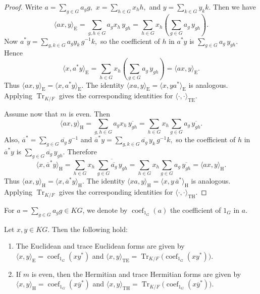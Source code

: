 \documentclass[11pt]{article}
\begin{document}
\begin{proof}
Write
$
a=\sum_{g\in G} a_g g,$ $
x=\sum_{h\in G} x_h h,$ and
$y=\sum_{k\in G} y_k k.$
Then we have
$$
\langle ax,y\rangle_{\mathrm{E}}
=
\sum_{g,h\in G} a_gx_h\,y_{gh}
=
\sum_{h\in G} x_h (\sum_{g\in G} a_g\,y_{gh}).
$$
Now $a^\ast y=\sum_{g,k\in G} a_g y_k\,g^{-1}k,
$
so the coefficient of $h$ in $a^\ast y$ is $\sum_{g\in G} a_g\,y_{gh}$. Hence
$$
\langle x,a^\ast y\rangle_{\mathrm{E}}
=
\sum_{h\in G} x_h (\sum_{g\in G} a_g\,y_{gh})
=
\langle ax,y\rangle_{\mathrm{E}}.
$$
Thus $\langle ax,y\rangle_{\mathrm{E}}=\langle x,a^\ast y\rangle_{\mathrm{E}}$. The identity
$
\langle xa,y\rangle_{\mathrm{E}}=\langle x,ya^\ast\rangle_{\mathrm{E}}
$
is analogous. Applying $\operatorname{Tr}_{K/F}$ gives the corresponding identities for $\langle\cdot,\cdot\rangle_{\mathrm{TE}}$.

Assume now that $m$ is even. Then
$$
\langle ax,y\rangle_{\mathrm{H}}
=
\sum_{g,h\in G} a_gx_h\,\overline{y_{gh}}
=
\sum_{h\in G} x_h \sum_{g\in G} a_g\,\overline{y_{gh}}.
$$
Also,
$
\overline{a}^\ast=\sum_{g\in G} \overline{a_g}\,g^{-1} $ and $
\overline{a}^\ast y=\sum_{g,k\in G} \overline{a_g}\,y_k\,g^{-1}k,
$
so the coefficient of $h$ in $\overline{a}^\ast y$ is $\sum_{g\in G} \overline{a_g}\,y_{gh}$. Therefore
$$
\langle x,\overline{a}^\ast y\rangle_{\mathrm{H}}
=
\sum_{h\in G} x_h\,
\overline{\sum_{g\in G} \overline{a_g}\,y_{gh}}
=
\sum_{h\in G} x_h \sum_{g\in G} a_g\,\overline{y_{gh}}
=
\langle ax,y\rangle_{\mathrm{H}}.
$$
Thus $\langle ax,y\rangle_{\mathrm{H}}=\langle x,\overline{a}^\ast y\rangle_{\mathrm{H}}$. The identity
$
\langle xa,y\rangle_{\mathrm{H}}=\langle x,y\,\overline{a}^\ast\rangle_{\mathrm{H}}
$
is analogous. Applying $\operatorname{Tr}_{K/F}$ gives the corresponding identities for $\langle\cdot,\cdot\rangle_{\mathrm{TH}}$.
\end{proof}


For $a=\sum_{g\in G} a_g g\in KG$, we denote by $\operatorname{coef}_{1_G}(a)$ the coefficient of $1_G$ in $a$.

\begin{proposition}
Let $x,y\in KG$. Then the following hold:
\begin{enumerate}
    \item The Euclidean and trace Euclidean forms are given by
    $
    \langle x,y\rangle_{\mathrm{E}}
    =
    \operatorname{coef}_{1_G}(xy^\ast)$ and
$ \langle x,y\rangle_{\mathrm{TE}}
    =   \operatorname{Tr}_{K/F}\!\bigl(\operatorname{coef}_{1_G}(xy^\ast)\bigr).
    $
    \item If $m$ is even, then the Hermitian and trace Hermitian forms are given by
    $    \langle x,y\rangle_{\mathrm{H}}
    =
    \operatorname{coef}_{1_G}(x\overline{y}^\ast)$ and $
    \langle x,y\rangle_{\mathrm{TH}}
    =
    \operatorname{Tr}_{K/F}\!\bigl(\operatorname{coef}_{1_G}(x\overline{y}^\ast)\bigr).
    $
\end{enumerate}
\end{proposition}
\end{document}
